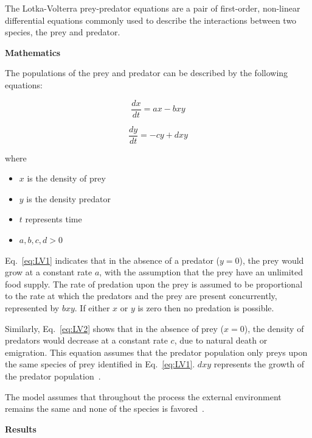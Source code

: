 \documentclass[11pt]{article}
\begin{document}
The Lotka-Volterra prey-predator equations are a pair of first-order, non-linear differential equations commonly used to describe the interactions between two species, the prey and predator.

\textbf{Mathematics}

The populations of the prey and predator can be described by the following equations:

    \begin{equation}
      \frac{dx}{dt} = ax - bxy
      \label{eq:LV1}
    \end{equation}
    
     \begin{equation}
      \frac{dy}{dt} = -cy + dxy
      \label{eq:LV2}
    \end{equation}
    

where
\begin{itemize}
\item $x$ is the density of prey
\item $y$ is the density predator
\item $t$ represents time
\item $a, b, c, d >0$ 
\end{itemize}

Eq.~\ref{eq:LV1} indicates that in the absence of a predator ($y = 0$), the prey would grow at a constant rate $a$, with the assumption that the prey have an unlimited food supply. The rate of predation upon the prey is assumed to be proportional to the rate at which the predators and the prey are present concurrently, represented by $bxy$. If either $x$ or $y$ is zero then no predation is possible.

Similarly, Eq.~\ref{eq:LV2} shows that in the absence of prey ($x = 0$), the density of predators would decrease at a constant rate $c$, due to natural death or emigration. This equation assumes that the predator population only preys upon the same species of prey identified in Eq.~\ref{eq:LV1}. $dxy$ represents the growth of the predator population~\cite{REF1}.

The model assumes that throughout the process the external environment remains the same and none of the species is favored~\cite{REF2}.

\textbf{Results}
\end{document}
